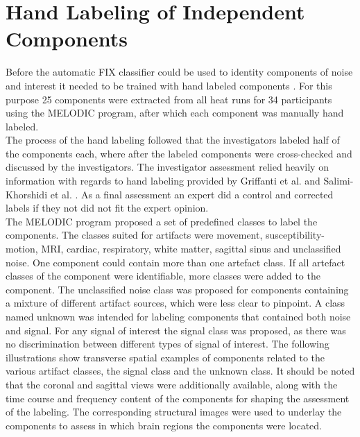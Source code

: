 \section{Hand Labeling of Independent Components}
Before the automatic FIX classifier could be used to identity components of noise and interest it needed to be trained with hand labeled components \cite{Salimi-Khorshidi2014}. For this purpose 25 components were extracted from all heat runs for 34 participants using the MELODIC program, after which each component was manually hand labeled. \\
The process of the hand labeling followed that the investigators labeled half of the components each, where after the labeled components were cross-checked and discussed by the investigators. The investigator assessment relied heavily on information with regards to hand labeling provided by Griffanti et al. \cite{Griffanti2017} and Salimi-Khorshidi et al. \cite{Salimi-Khorshidi2014}. As a final assessment an expert did a control and corrected labels if they not did not fit the expert opinion. \\
The MELODIC program proposed a set of predefined classes to label the components. The classes suited for artifacts were movement, susceptibility-motion, MRI, cardiac, respiratory, white matter, sagittal sinus and unclassified noise. One component could contain more than one artefact class. If all artefact classes of the component were identifiable, more classes were added to the component. The unclassified noise class was proposed for components containing a mixture of different artifact sources, which were less clear to pinpoint. A class named unknown was intended for labeling components that contained both noise and signal. For any signal of interest the signal class was proposed, as there was no discrimination between different types of signal of interest. 
The following illustrations show transverse spatial examples of components related to the various artifact classes, the signal class and the unknown class. It should be noted that the coronal and sagittal views were additionally available, along with the time course and frequency content of the components for shaping the assessment of the labeling. The corresponding structural images were used to underlay the components to assess in which brain regions the components were located. 

